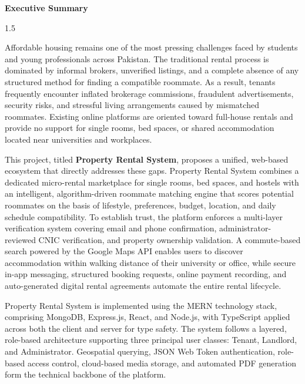 

\newpage
\thispagestyle{plain}


\begin{center}
\textbf{\LARGE Executive Summary}
\end{center}

\vspace{1cm}

\begin{spacing}{1.5}

Affordable housing remains one of the most pressing challenges faced by students and young professionals across Pakistan. The traditional rental process is dominated by informal brokers, unverified listings, and a complete absence of any structured method for finding a compatible roommate. As a result, tenants frequently encounter inflated brokerage commissions, fraudulent advertisements, security risks, and stressful living arrangements caused by mismatched roommates. Existing online platforms are oriented toward full-house rentals and provide no support for single rooms, bed spaces, or shared accommodation located near universities and workplaces.

This project, titled \textbf{Property Rental System}, proposes a unified, web-based ecosystem that directly addresses these gaps. Property Rental System combines a dedicated micro-rental marketplace for single rooms, bed spaces, and hostels with an intelligent, algorithm-driven roommate matching engine that scores potential roommates on the basis of lifestyle, preferences, budget, location, and daily schedule compatibility. To establish trust, the platform enforces a multi-layer verification system covering email and phone confirmation, administrator-reviewed CNIC verification, and property ownership validation. A commute-based search powered by the Google Maps API enables users to discover accommodation within walking distance of their university or office, while secure in-app messaging, structured booking requests, online payment recording, and auto-generated digital rental agreements automate the entire rental lifecycle.

Property Rental System is implemented using the MERN technology stack, comprising MongoDB, Express.js, React, and Node.js, with TypeScript applied across both the client and server for type safety. The system follows a layered, role-based architecture supporting three principal user classes: Tenant, Landlord, and Administrator. Geospatial querying, JSON Web Token authentication, role-based access control, cloud-based media storage, and automated PDF generation form the technical backbone of the platform.


\end{spacing}
